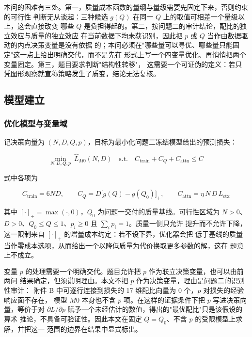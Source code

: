 \documentclass[bwprint]{gmcmthesis}
\numberwithin{equation}{section}
\numberwithin{figure}{section}
\numberwithin{table}{section}
\begin{document}
本问的困难有三处。第一，质量成本函数的量纲与量级需要先固定下来，否则约束的可行性
判断无从谈起：三种候选 $g(Q)$ 在同一 $Q$ 上的取值可相差一个量级以上，这会直接改变
哪些 $Q$ 是负担得起的。第二，按问题二的审计结论，配比的独立效应与质量的独立效应
在当前数据下均未获识别，因此把 $p$ 或 $Q$ 当作由数据驱动的内点决策变量是没有依据
的；本问必须在"哪些量可以寻优、哪些量只能固定"这一点上给出明确交代，而不是先在
形式上写一个四变量优化、再悄悄把两个变量固定。第三，题目要求判断"结构性转移"，
这需要一个可证伪的定义：若只凭图形观察就宣称策略发生了质变，结论无法复核。

\subsection{模型建立}

\subsubsection{优化模型与变量域}

记决策向量为 $(N,D,Q,p)$，目标为最小化问题二冻结模型给出的预测损失：

\begin{equation}
\min_{N,D,Q,p}\ \hat L_{M0}(N,D)
\quad\text{s.t.}\quad
C_{\mathrm{train}}+C_Q+C_{\mathrm{attn}}\le C
\end{equation}

式中各项为

\begin{equation}
C_{\mathrm{train}}=6ND,\qquad
C_Q=D\bigl[g(Q)-g(Q_0)\bigr]_+,\qquad
C_{\mathrm{attn}}=\eta\,N\,D\,L_{\mathrm{ctx}}
\end{equation}

其中 $[\cdot]_+=\max(\cdot,0)$，$Q_0$ 为问题一交付的质量基线。可行性区域为
$N>0$、$D>0$、$Q_0\le Q\le 1$、$p_i\ge0$ 且 $\sum_i p_i=1$。质量一侧只允许
提升而不允许下降，这一限制来自 $[\cdot]_+$ 的增量成本约定：若不设下界，优化器会把
低于基线的质量当作零成本选项，从而给出一个以降低质量为代价换取更多参数的解，这在
题意上不成立。

变量 $p$ 的处理需要一个明确交代。题目允许把 $p$ 作为联立决策变量，也可以由前两问
结果确定，但须说明理由。本文不把 $p$ 作为决策变量，理由是问题二的识别性审计：
附件 B 中可逐行连接到损失的 17 维配比向量为 0 个，$p$ 对损失的经验响应面不存在，
模型 $M0$ 本身也不含 $p$ 项。在这样的证据条件下把 $p$ 写进决策向量，等价于对
$\partial L/\partial p$ 赋予一个未经估计的数值，得出的"最优配比"只是该假设的算术
推论，不具备可验证性。因此本文在固定 $Q=Q_0$、不含 $p$ 的受限模型上求解，并把这一
范围的边界在结果中显式标出。
\end{document}
